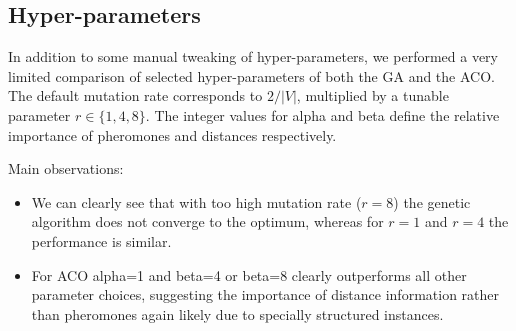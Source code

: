 \documentclass[12pt]{article}
\begin{document}
\subsection{Hyper-parameters}
In addition to some manual tweaking of hyper-parameters, we performed a very limited comparison of selected hyper-parameters of both the GA and the ACO. 
The default mutation rate corresponds to $2/|V|$, multiplied by a tunable parameter $r \in \{1,4,8\}$. The integer values for alpha and beta define the relative importance of pheromones and distances respectively. 

Main observations:
\begin{itemize}
	\item We can clearly see that with too high mutation rate ($r=8$) the genetic algorithm does not converge to the optimum, whereas for $r=1$ and $r=4$ the performance is similar.
	\item For ACO alpha=1 and beta=4 or beta=8 clearly outperforms all other parameter choices, suggesting the importance of distance information rather than pheromones again likely due to specially structured instances.
\end{itemize}
\end{document}
